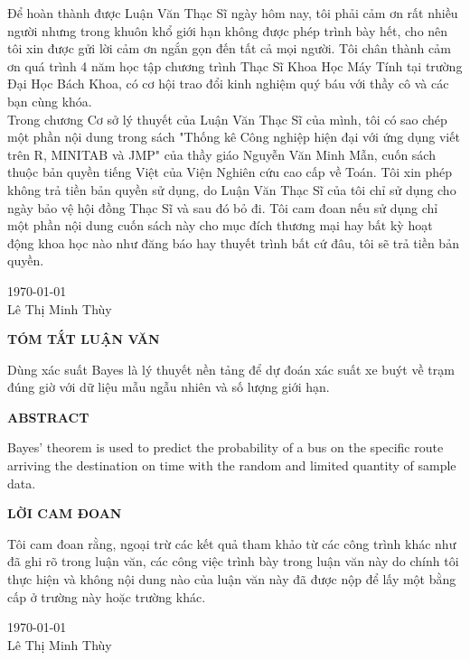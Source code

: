 \documentclass[a4paper, 13pt]{report}
\begin{document}
Để hoàn thành được Luận Văn Thạc Sĩ ngày hôm nay, tôi phải cảm ơn rất nhiều người nhưng trong khuôn khổ giới hạn không được phép trình bày hết, cho nên tôi xin được gửi lời cảm ơn ngắn gọn đến tất cả mọi người. Tôi chân thành cảm ơn quá trình 4 năm học tập chương trình Thạc Sĩ Khoa Học Máy Tính tại trường Đại Học Bách Khoa, có cơ hội trao đổi kinh nghiệm quý báu với thầy cô và các bạn cùng khóa.\\
Trong chương Cơ sở lý thuyết của Luận Văn Thạc Sĩ của mình, tôi có sao chép một phần nội dung trong sách "Thống kê Công nghiệp hiện đại với ứng dụng viết trên R, MINITAB và JMP" của thầy giáo Nguyễn Văn Minh Mẫn, cuốn sách thuộc bản quyền tiếng Việt của Viện Nghiên cứu cao cấp về Toán. Tôi xin phép không trả tiền bản quyền sử dụng, do Luận Văn Thạc Sĩ của tôi chỉ sử dụng cho ngày bảo vệ hội đồng Thạc Sĩ và sau đó bỏ đi. Tôi cam đoan nếu sử dụng chỉ một phần nội dung cuốn sách này cho mục đích thương mại hay bất kỳ hoạt động khoa học nào như đăng báo hay thuyết trình bất cứ đâu, tôi sẽ trả tiền bản quyền.\\
\begin{flushright}
\today\\
Lê Thị Minh Thùy
\end{flushright}
\pagebreak
\begin{center}{\fontsize{16pt}{1}\selectfont \textbf{TÓM TẮT LUẬN VĂN}}\\\end{center}
Dùng xác suất Bayes là lý thuyết nền tảng để dự đoán xác suất xe buýt về trạm đúng giờ với dữ liệu mẫu ngẫu nhiên và số lượng giới hạn.
\pagebreak
\begin{center}{\fontsize{16pt}{1}\selectfont \textbf{ABSTRACT}}\\\end{center}
Bayes' theorem is used to predict the probability of a bus on the specific route arriving the destination on time with the random and limited quantity of sample data.  
\pagebreak
\begin{center}{\fontsize{16pt}{1}\selectfont \textbf{LỜI CAM ĐOAN}}\\\end{center}
Tôi cam đoan rằng, ngoại trừ các kết quả tham khảo từ các công trình khác như đã ghi rõ trong luận văn, các công việc trình bày trong luận văn này do chính tôi thực hiện và không nội dung nào của luận văn này đã được nộp để lấy một bằng cấp ở trường này hoặc trường khác.\\
\begin{flushright}
\today\\
Lê Thị Minh Thùy
\end{flushright}

\tableofcontents
\pagebreak
{}
\end{document}
